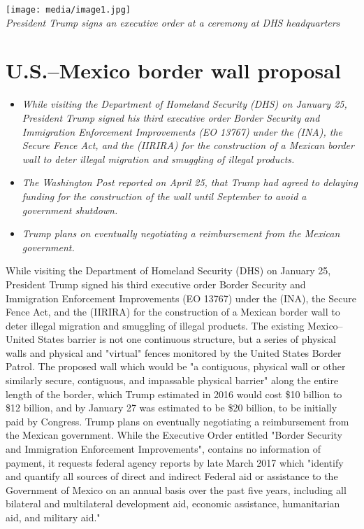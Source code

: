 \texttt{[image: media/image1.jpg]}\\
\emph{President Trump signs an executive order at a ceremony at DHS
headquarters}

\section{U.S.--Mexico border wall
proposal}\label{u.s.mexico-border-wall-proposal}

\begin{itemize}
\item
  \emph{While visiting the Department of Homeland Security (DHS) on
  January 25, President Trump signed his third executive order Border
  Security and Immigration Enforcement Improvements (EO 13767) under the
  (INA), the Secure Fence Act, and the (IIRIRA) for the construction of
  a Mexican border wall to deter illegal migration and smuggling of
  illegal products.}
\item
  \emph{The Washington Post reported on April 25, that Trump had agreed
  to delaying funding for the construction of the wall until September
  to avoid a government shutdown.}
\item
  \emph{Trump plans on eventually negotiating a reimbursement from the
  Mexican government.}
\end{itemize}

While visiting the Department of Homeland Security (DHS) on January 25,
President Trump signed his third executive order Border Security and
Immigration Enforcement Improvements (EO 13767) under the (INA), the
Secure Fence Act, and the (IIRIRA) for the construction of a Mexican
border wall to deter illegal migration and smuggling of illegal
products. The existing Mexico--United States barrier is not one
continuous structure, but a series of physical walls and physical and
"virtual" fences monitored by the United States Border Patrol. The
proposed wall which would be "a contiguous, physical wall or other
similarly secure, contiguous, and impassable physical barrier" along the
entire length of the border, which Trump estimated in 2016 would cost
\$10 billion to \$12 billion, and by January 27 was estimated to be \$20
billion, to be initially paid by Congress. Trump plans on eventually
negotiating a reimbursement from the Mexican government. While the
Executive Order entitled "Border Security and Immigration Enforcement
Improvements", contains no information of payment, it requests federal
agency reports by late March 2017 which "identify and quantify all
sources of direct and indirect Federal aid or assistance to the
Government of Mexico on an annual basis over the past five years,
including all bilateral and multilateral development aid, economic
assistance, humanitarian aid, and military aid."

